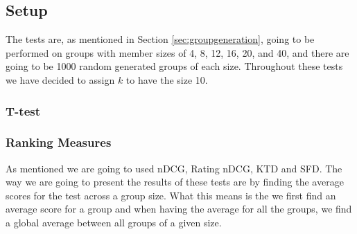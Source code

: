 \subsection{Setup}\label{sec:setup}
The tests are, as mentioned in Section \ref{sec:groupgeneration}, going to be performed on groups with member sizes of 4, 8, 12, 16, 20, and 40, and there are going to be 1000 random generated groups of each size. Throughout these tests we have decided to assign $k$ to have the size 10.  
\subsubsection{T-test}

\subsubsection{Ranking Measures}
As mentioned we are going to used nDCG, Rating nDCG, KTD and SFD. The way we are going to present the results of these tests are by finding the average scores for the test across a group size. What this means is the we first find an average score for a group and when having the average for all the groups, we find a global average between all groups of a given size. 